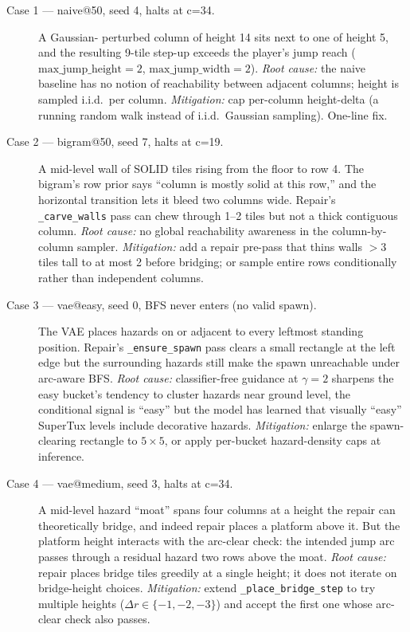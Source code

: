 \documentclass[11pt]{article}
\begin{document}
\begin{description}
    \item[Case 1 --- naive@50, seed 4, halts at c=34.] A Gaussian-
    perturbed column of height 14 sits next to one of height 5, and
    the resulting 9-tile step-up exceeds the player's jump reach
    ($\text{max\_jump\_height}=2$, $\text{max\_jump\_width}=2$).
    \emph{Root cause:} the naive baseline has no notion of reachability
    between adjacent columns; height is sampled i.i.d.\ per column.
    \emph{Mitigation:} cap per-column height-delta (a running
    random walk instead of i.i.d.\ Gaussian sampling). One-line fix.

    \item[Case 2 --- bigram@50, seed 7, halts at c=19.] A mid-level
    wall of SOLID tiles rising from the floor to row 4. The bigram's
    row prior says ``column is mostly solid at this row,'' and the
    horizontal transition lets it bleed two columns wide. Repair's
    \texttt{\_carve\_walls} pass can chew through 1--2 tiles but not
    a thick contiguous column.
    \emph{Root cause:} no global reachability awareness in the
    column-by-column sampler.
    \emph{Mitigation:} add a repair pre-pass that thins walls
    $>3$ tiles tall to at most 2 before bridging; or sample entire
    rows conditionally rather than independent columns.

    \item[Case 3 --- vae@easy, seed 0, BFS never enters (no valid spawn).]
    The VAE places hazards on or adjacent to every leftmost standing
    position. Repair's \texttt{\_ensure\_spawn} pass clears a small
    rectangle at the left edge but the surrounding hazards still make
    the spawn unreachable under arc-aware BFS.
    \emph{Root cause:} classifier-free guidance at $\gamma=2$ sharpens
    the easy bucket's tendency to cluster hazards near ground level,
    the conditional signal is ``easy'' but the model has learned
    that visually ``easy'' SuperTux levels include decorative hazards.
    \emph{Mitigation:} enlarge the spawn-clearing rectangle to
    $5 \times 5$, or apply per-bucket hazard-density caps at inference.

    \item[Case 4 --- vae@medium, seed 3, halts at c=34.] A mid-level
    hazard ``moat'' spans four columns at a height the repair can
    theoretically bridge, and indeed repair places a platform above
    it. But the platform height interacts with the arc-clear check:
    the intended jump arc passes through a residual hazard two rows
    above the moat.
    \emph{Root cause:} repair places bridge tiles greedily at a single
    height; it does not iterate on bridge-height choices.
    \emph{Mitigation:} extend \texttt{\_place\_bridge\_step} to try
    multiple heights ($\Delta r \in \{-1, -2, -3\}$) and accept the
    first one whose arc-clear check also passes.


\end{description}
\end{document}
